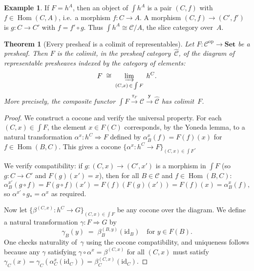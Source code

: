 \documentclass[a4paper,12pt]{book}
\DeclareMathOperator{\Hom}{Hom}
\newcommand{\Set}{\mathbf{Set}}
\newcommand{\op}{\mathrm{op}}
\newcommand{\id}{\mathrm{id}}
\theoremstyle{definition}
\newtheorem{example}[definition]{Example}
\theoremstyle{plain}
\newtheorem{theorem}[definition]{Theorem}
\theoremstyle{remark}
\begin{document}
\begin{example}\label{ex:elements-representable}
If $F = h^A$, then an object of $\int h^A$ is a pair $(C,f)$ with
$f\in\Hom(C,A)$, i.e.\ a morphism $f\colon C\to A$.
A morphism $(C,f)\to(C',f')$ is $g\colon C\to C'$ with $f = f'\circ g$.
Thus $\int h^A \cong \mathcal{C}/A$, the slice category over~$A$.
\end{example}

\begin{theorem}[Every presheaf is a colimit of representables]%
\label{thm:presheaf-colim-rep}
Let $F\colon\mathcal{C}^{\op}\to\Set$ be a presheaf.  Then $F$ is the
colimit, in the presheaf category~$\widehat{\mathcal{C}}$, of the
diagram of representable presheaves indexed by the category of elements:
\[
    F \;\cong\; \varinjlim_{(C,x)\,\in\,\int F}\; h^C.
\]
More precisely, the composite functor
$\int F \xrightarrow{\pi_F} \mathcal{C} \xrightarrow{\mathbf{y}}
\widehat{\mathcal{C}}$
has colimit~$F$.
\end{theorem}

\begin{proof}
We construct a cocone and verify the universal property.
For each $(C,x)\in\int F$, the element $x\in F(C)$ corresponds, by the
Yoneda lemma, to a natural transformation
$\alpha^x\colon h^C\Rightarrow F$
defined by $\alpha^x_B(f) = F(f)(x)$ for $f\in\Hom(B,C)$.
This gives a cocone $\{\alpha^x\colon h^C\to F\}_{(C,x)\in\int F}$.

We verify compatibility: if $g\colon(C,x)\to(C',x')$ is a morphism in
$\int F$ (so $g\colon C\to C'$ and $F(g)(x') = x$), then for all
$B\in\mathcal{C}$ and $f\in\Hom(B,C)$:
\[
    \alpha^{x'}_B(g\circ f) = F(g\circ f)(x') = F(f)(F(g)(x'))
    = F(f)(x) = \alpha^x_B(f),
\]
so $\alpha^{x'}\circ g_* = \alpha^x$ as required.

Now let $\{\beta^{(C,x)}\colon h^C\to G\}_{(C,x)\in\int F}$ be any
cocone over the diagram.  We define a natural transformation
$\gamma\colon F\Rightarrow G$ by
\[
    \gamma_B(y) \;=\; \beta^{(B,y)}_B(\id_B) \quad\text{for } y\in F(B).
\]
One checks naturality of~$\gamma$ using the cocone compatibility, and
uniqueness follows because any $\gamma$ satisfying
$\gamma\circ\alpha^x = \beta^{(C,x)}$ for all $(C,x)$ must satisfy
$\gamma_C(x) = \gamma_C(\alpha^x_C(\id_C)) = \beta^{(C,x)}_C(\id_C)$.
\end{proof}
\end{document}
